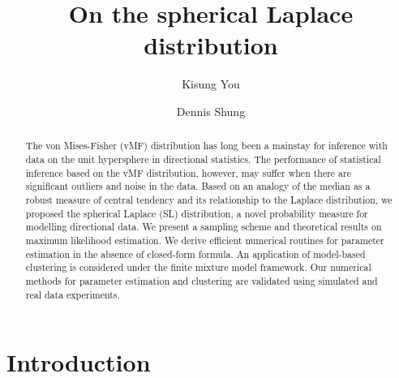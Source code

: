 \documentclass[10pt]{article}
\begin{document}
	
\title{On the spherical Laplace distribution}
\author[1]{Kisung You}
\author[1]{Dennis Shung}
\date{}

\maketitle
\begin{abstract}
The von Mises-Fisher (vMF) distribution has long been a mainstay for inference with data on the unit hypersphere in directional statistics. The performance of statistical inference based on the vMF distribution, however, may suffer when there are significant outliers and noise in the data. Based on an analogy of the median as a robust measure of central tendency and its relationship to the Laplace distribution, we proposed the spherical Laplace (SL) distribution, a novel probability measure for modelling directional data. We present a sampling scheme and theoretical results on maximum likelihood estimation. We derive efficient numerical routines for parameter estimation in the absence of closed-form formula. An application of model-based clustering is considered under the finite mixture model framework. Our numerical methods for parameter estimation and clustering are validated using simulated and real data experiments.
\end{abstract}



\section{Introduction}\label{sec1:intro}
\end{document}
